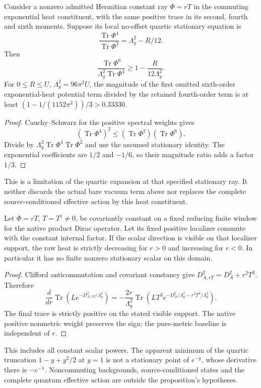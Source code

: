 \documentclass[11pt,a4paper]{article}
\begin{document}
\begin{proposition}
\label{p3f:prop:v2217-quartic-omitted-term}
Consider a nonzero admitted Hermitian constant ray $\Phi=rT$ in the
commuting exponential heat constituent, with the same positive trace in
its second, fourth and sixth moments. Suppose its local no-offset quartic
stationary equation is
\[
 \frac{\operatorname{Tr}\Phi^4}{\operatorname{Tr}\Phi^2}
       =\Lambda_g^2-R/12.
\]
Then
\[
 \frac{\operatorname{Tr}\Phi^6}{\Lambda_g^2\operatorname{Tr}\Phi^4}
 \ge1-\frac{R}{12\Lambda_g^2}.
\]
For $0\le R\le U$, $\Lambda_g^2=96\pi^2U$, the magnitude of the first
omitted sixth-order exponential-heat potential term divided by the
retained fourth-order term is at least
$(1-1/(1152\pi^2))/3>0.33330$.
\end{proposition}
\begin{proof}
Cauchy--Schwarz for the positive spectral weights gives
\[
 (\operatorname{Tr}\Phi^4)^2\le
 (\operatorname{Tr}\Phi^2)(\operatorname{Tr}\Phi^6).
\]
Divide by $\Lambda_g^2\operatorname{Tr}\Phi^4\operatorname{Tr}\Phi^2$
and use the assumed stationary identity. The exponential coefficients
are $1/2$ and $-1/6$, so their magnitude ratio adds a factor $1/3$.
\end{proof}
This is a limitation of the quartic expansion at that specified stationary
ray. It neither discards the actual bare vacuum term above nor replaces
the complete source-conditioned effective action by this heat constituent.

\begin{proposition}
\label{p3f:prop:v2216-commuting-heat-condensate}
Let $\Phi=rT$, $T=T^\dagger\ne0$, be covariantly constant on a
fixed reducing finite window for the native product Dirac operator.
Let its fixed positive localizer commute with the constant internal
factor.  If the scalar direction is visible on that localizer support,
the raw heat is strictly decreasing for $r>0$ and increasing for $r<0$.
In particular it has no finite nonzero stationary scalar on this domain.
\end{proposition}
\begin{proof}
Clifford anticommutation and covariant constancy give
$D_{A,rT}^2=D_A^2+r^2T^2$.  Therefore
\[
 \frac d{dr}\operatorname{Tr}(Le^{-D_{A,rT}^2/\Lambda_g^2})
 =-\frac{2r}{\Lambda_g^2}\operatorname{Tr}
 (LT^2e^{-D_A^2/\Lambda_g^2-r^2T^2/\Lambda_g^2}).
\]
The final trace is strictly positive on the stated visible support.
The native positive nonmetric weight preserves the sign; the
pure-metric baseline is independent of $r$.
\end{proof}
This includes all constant scalar powers.  The apparent minimum of the
quartic truncation $1-y+y^2/2$ at $y=1$ is not a stationary point of
$e^{-y}$, whose derivative there is $-e^{-1}$.  Noncommuting backgrounds,
source-conditioned states and the complete quantum effective action are
outside the proposition's hypotheses.
\end{document}
